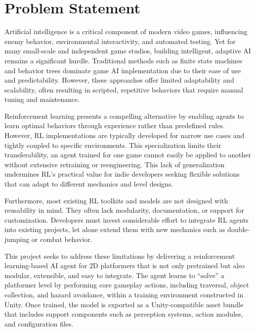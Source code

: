 \documentclass[12pt,oneside,openright,a4paper]{cpe-english-project}
\begin{document}
\section{Problem Statement}

Artificial intelligence is a critical component of modern video games, influencing enemy behavior, environmental interactivity, and automated testing. Yet for many small-scale and independent game studios, building intelligent, adaptive AI remains a significant hurdle. Traditional methods such as finite state machines and behavior trees dominate game AI implementation due to their ease of use and predictability. However, these approaches offer limited adaptability and scalability, often resulting in scripted, repetitive behaviors that require manual tuning and maintenance.\par

Reinforcement learning presents a compelling alternative by enabling agents to learn optimal behaviors through experience rather than predefined rules. However, RL implementations are typically developed for narrow use cases and tightly coupled to specific environments. This specialization limits their transferability, an agent trained for one game cannot easily be applied to another without extensive retraining or reengineering. This lack of generalization undermines RL's practical value for indie developers seeking flexible solutions that can adapt to different mechanics and level designs.\par

Furthermore, most existing RL toolkits and models are not designed with reusability in mind. They often lack modularity, documentation, or support for customization. Developers must invest considerable effort to integrate RL agents into existing projects, let alone extend them with new mechanics such as double-jumping or combat behavior.\par

This project seeks to address these limitations by delivering a reinforcement learning-based AI agent for 2D platformers that is not only pretrained but also modular, extensible, and easy to integrate. The agent learns to “solve” a platformer level by performing core gameplay actions, including traversal, object collection, and hazard avoidance, within a training environment constructed in Unity. Once trained, the model is exported as a Unity-compatible asset bundle that includes support components such as perception systems, action modules, and configuration files.\par
\end{document}
